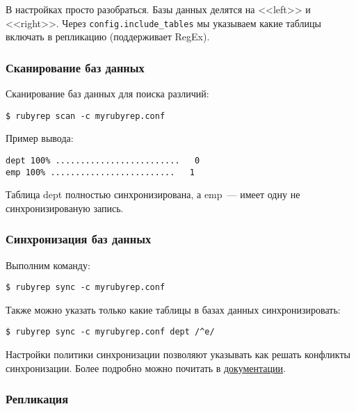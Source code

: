 В настройках просто разобраться. Базы данных делятся на <<left>> и <<right>>. Через \lstinline!config.include_tables! мы указываем какие таблицы включать в репликацию (поддерживает RegEx).

\subsubsection{Сканирование баз данных}

Сканирование баз данных для поиска различий:

\begin{lstlisting}[label=lst:rubyrep6,caption=Сканирование баз данных]
$ rubyrep scan -c myrubyrep.conf
\end{lstlisting}

Пример вывода:

\begin{lstlisting}[label=lst:rubyrep7,caption=Сканирование баз данных]
dept 100% .........................   0
emp 100% .........................   1
\end{lstlisting}

Таблица dept полностью синхронизирована, а emp~--- имеет одну не синхронизированую запись.

\subsubsection{Синхронизация баз данных}

Выполним команду:

\begin{lstlisting}[label=lst:rubyrep8,caption=Синхронизация баз данных]
$ rubyrep sync -c myrubyrep.conf
\end{lstlisting}

Также можно указать только какие таблицы в базах данных синхронизировать:

\begin{lstlisting}[label=lst:rubyrep9,caption=Синхронизация баз данных]
$ rubyrep sync -c myrubyrep.conf dept /^e/
\end{lstlisting}

Настройки политики синхронизации позволяют указывать как решать конфликты синхронизации. Более подробно можно почитать в \href{http://www.rubyrep.org/configuration.html}{документации}.

\subsubsection{Репликация}

